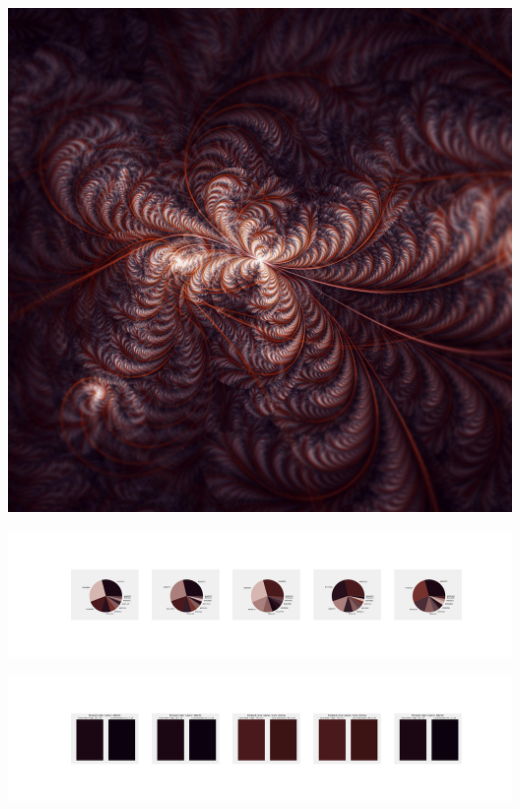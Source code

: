 \documentclass[11pt]{article}
\begin{document}
\begin{landscape}
    \begin{center}
    \includegraphics[width=\textwidth]{./nbimg/file (160).jpg}
    \end{center}

    \begin{center}
    \includegraphics[width=250mm]{./nbimg/pie-68.jpg}
    \end{center}

    \begin{center}
    \includegraphics[width=250mm]{./nbimg/peak-68.jpg}
    \end{center}
    


\end{landscape}
\end{document}
